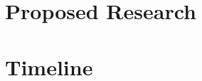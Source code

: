 \documentclass[modern]{aastex62}
\begin{document}





\section{Proposed Research}

\section{Timeline}




\end{document}
